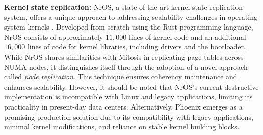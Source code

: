 \textbf{Kernel state replication:} NrOS, a state-of-the-art kernel state replication system, offers a unique approach to addressing scalability challenges in operating system kernels \cite{nros}. Developed from scratch using the Rust programming language, NrOS consists of approximately $11,000$ lines of kernel code and an additional $16,000$ lines of code for kernel libraries, including drivers and the bootloader. While NrOS shares similarities with Mitosis in replicating page tables across NUMA nodes, it distinguishes itself through the adoption of a novel approach called \emph{node replication}. This technique ensures coherency maintenance and enhances scalability. However, it should be noted that NrOS's current destructive implementation is incompatible with Linux and legacy applications, limiting its practicality in present-day data centers. Alternatively, Phoenix emerges as a promising production solution due to its compatibility with legacy applications, minimal kernel modifications, and reliance on stable kernel building blocks.